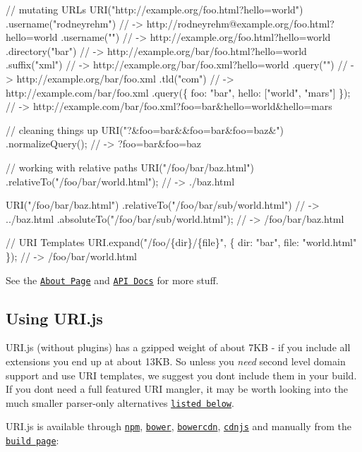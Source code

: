 \begin{DoxyCode}
// mutating URLs
URI("http://example.org/foo.html?hello=world")
  .username("rodneyrehm")
    // -> http://rodneyrehm@example.org/foo.html?hello=world
  .username("")
    // -> http://example.org/foo.html?hello=world
  .directory("bar")
    // -> http://example.org/bar/foo.html?hello=world
  .suffix("xml")
    // -> http://example.org/bar/foo.xml?hello=world
  .query("")
    // -> http://example.org/bar/foo.xml
  .tld("com")
    // -> http://example.com/bar/foo.xml
  .query(\{ foo: "bar", hello: ["world", "mars"] \});
    // -> http://example.com/bar/foo.xml?foo=bar&hello=world&hello=mars

// cleaning things up
URI("?&foo=bar&&foo=bar&foo=baz&")
  .normalizeQuery();
    // -> ?foo=bar&foo=baz

// working with relative paths
URI("/foo/bar/baz.html")
  .relativeTo("/foo/bar/world.html");
    // -> ./baz.html

URI("/foo/bar/baz.html")
  .relativeTo("/foo/bar/sub/world.html")
    // -> ../baz.html
  .absoluteTo("/foo/bar/sub/world.html");
    // -> /foo/bar/baz.html

// URI Templates
URI.expand("/foo/\{dir\}/\{file\}", \{
  dir: "bar",
  file: "world.html"
\});
// -> /foo/bar/world.html
\end{DoxyCode}


See the \href{http://medialize.github.io/URI.js/}{\tt About Page} and \href{http://medialize.github.io/URI.js/docs.html}{\tt A\+PI Docs} for more stuff.

\subsection*{Using U\+R\+I.\+js}

U\+R\+I.\+js (without plugins) has a gzipped weight of about 7\+KB -\/ if you include all extensions you end up at about 13\+KB. So unless you {\itshape need} second level domain support and use U\+RI templates, we suggest you don\textquotesingle{}t include them in your build. If you don\textquotesingle{}t need a full featured U\+RI mangler, it may be worth looking into the much smaller parser-\/only alternatives \href{#alternatives}{\tt listed below}.

U\+R\+I.\+js is available through \href{https://www.npmjs.com/package/urijs}{\tt npm}, \href{http://bower.io/search/?q=urijs}{\tt bower}, \href{http://bowercdn.net/package/urijs}{\tt bowercdn}, \href{https://cdnjs.com/libraries/URI.js}{\tt cdnjs} and manually from the \href{http://medialize.github.io/URI.js/build.html}{\tt build page}\+:


